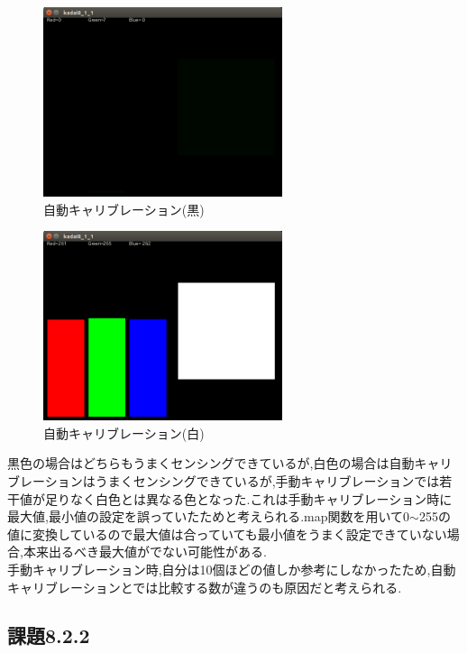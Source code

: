 \documentclass{jarticle}
\begin{document}
\begin{figure}[H]
\begin{center}
\includegraphics[width=7.0cm]{images/kadai8-1-1-auto-black-yoi.png}
\caption{自動キャリブレーション(黒)}
\label{fig:kadai8-2-1-a-b}
\end{center}
\end{figure}

\begin{figure}[H]
\begin{center}
\includegraphics[width=7.0cm]{images/kadai8-1-1-auto-white-yoi.png}
\caption{自動キャリブレーション(白)}
\label{fig:kadai8-2-1-a-w}
\end{center}
\end{figure}

黒色の場合はどちらもうまくセンシングできているが,白色の場合は自動キャリブレーションはうまくセンシングできているが,手動キャリブレーションでは若干値が足りなく白色とは異なる色となった.これは手動キャリブレーション時に最大値,最小値の設定を誤っていたためと考えられる.map関数を用いて0$\sim$255の値に変換しているので最大値は合っていても最小値をうまく設定できていない場合,本来出るべき最大値がでない可能性がある. \\
手動キャリブレーション時,自分は10個ほどの値しか参考にしなかったため,自動キャリブレーションとでは比較する数が違うのも原因だと考えられる.

\subsection{課題8.2.2}\label{subsec:kadai8-2-2}
\end{document}
